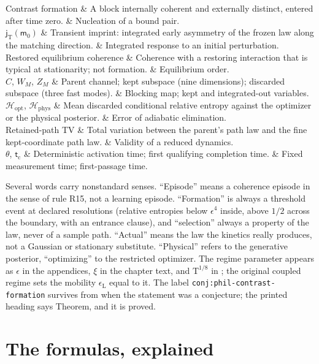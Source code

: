 \begin{decoder}
Contrast formation & A block internally coherent and externally distinct, entered after time zero. & Nucleation of a bound pair. \\
$\mathsf j_{\mathrm T}(\mathsf m_0)$ & Transient imprint: integrated early asymmetry of the frozen law along the matching direction. & Integrated response to an initial perturbation. \\
Restored equilibrium coherence & Coherence with a restoring interaction that is typical at stationarity; not formation. & Equilibrium order. \\
$C$, $W_M$, $Z_M$ & Parent channel; kept subspace (nine dimensions); discarded subspace (three fast modes). & Blocking map; kept and integrated-out variables. \\
$\mathcal H_{\mathrm{opt}}$, $\mathcal H_{\mathrm{phys}}$ & Mean discarded conditional relative entropy against the optimizer or the physical posterior. & Error of adiabatic elimination. \\
Retained-path TV & Total variation between the parent's path law and the fine kept-coordinate path law. & Validity of a reduced dynamics. \\
$\theta$, $\mathsf t_{\mathrm c}$ & Deterministic activation time; first qualifying completion time. & Fixed measurement time; first-passage time. \\
\end{decoder}

Several words carry nonstandard senses. ``Episode'' means a coherence episode in the sense of rule R15,
not a learning episode. ``Formation'' is always a threshold event at declared resolutions (relative
entropies below $\epsilon^4$ inside, above $1/2$ across the boundary, with an entrance clause), and
``selection'' always a property of the law, never of a sample path. ``Actual'' means the law the kinetics
really produces, not a Gaussian or stationary substitute. ``Physical'' refers to the generative posterior,
``optimizing'' to the restricted optimizer. The regime parameter appears as $\epsilon$ in the appendices,
$\xi$ in the chapter text, and $\mathrm T^{1/8}$ in ; the original coupled
regime sets the mobility $\epsilon_{\mathrm L}$ equal to it. The label
\texttt{conj:phil-contrast-formation} survives from when the statement was a conjecture; the printed
heading says Theorem, and it is proved.

\section{The formulas, explained}
\label{comp:ch14-formulas}

